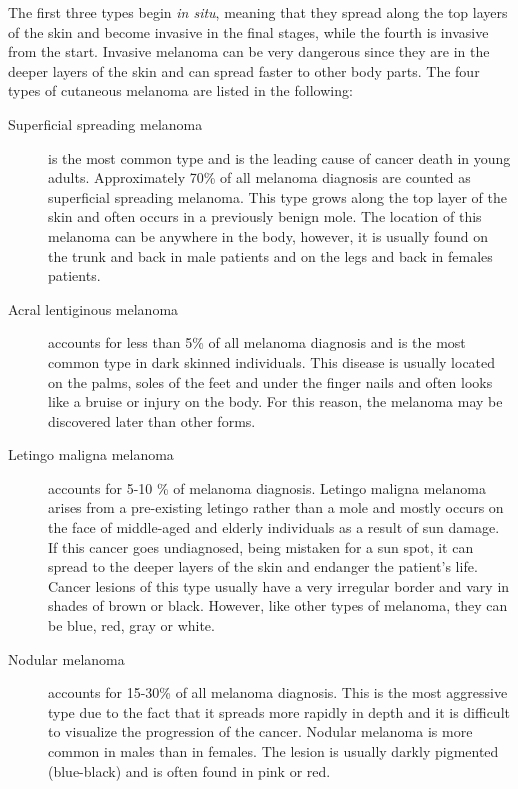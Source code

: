 The first three types begin \textit{in situ}, meaning that they spread along the top layers of the skin and become invasive in the final stages, while the fourth is invasive from the start.
Invasive melanoma can be very dangerous since they are in the deeper layers of the skin and can spread faster to other body parts. The four types of cutaneous melanoma are listed in the following: 
	\begin{description}
	\item [Superficial spreading melanoma] 
	is the most common type and is the leading cause of cancer death in young adults. 
	Approximately 70\% of all melanoma diagnosis are counted as superficial spreading melanoma. 
	This type grows along the top layer of the skin and often occurs in a previously benign mole. 
	The location of this melanoma can be anywhere in the body, however, it is usually found on the trunk and back in male patients and on the legs and back in females patients.   
	\item [Acral lentiginous melanoma]
	accounts for less than 5\% of all melanoma diagnosis and is the most common type in dark skinned individuals. 
	This disease is usually located on the palms, soles of the feet and under the finger nails and often looks like a bruise or injury on the body.
	For this reason, the melanoma may be discovered later than other forms.  	
	\item [Letingo maligna melanoma]
	accounts for 5-10 \% of melanoma diagnosis. Letingo maligna melanoma arises from a pre-existing letingo rather than a mole and mostly occurs on the face of middle-aged and elderly individuals as a result of sun damage. 
If this cancer goes undiagnosed, being mistaken for a sun spot, it can spread to the deeper layers of the skin and endanger the patient's life. 
Cancer lesions of this type usually have a very irregular border and vary in shades of brown or black.
However, like other types of melanoma, they can be blue, red, gray or white. 
	\item [Nodular melanoma]
	accounts for 15-30\% of all melanoma diagnosis. 
	This is the most aggressive type due to the fact that it spreads more rapidly in depth and it is difficult to visualize the progression of the cancer.
Nodular melanoma is more common in males than in females. 
The lesion is usually darkly pigmented (blue-black) and is often found in pink or red. 
	\end{description}
	
